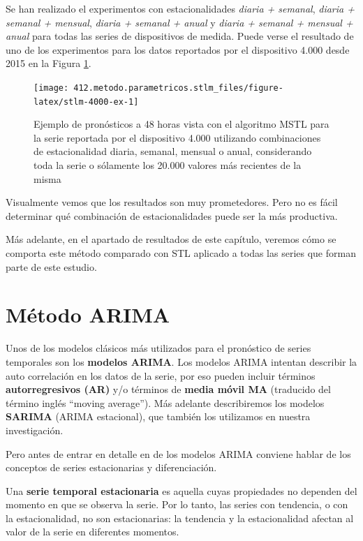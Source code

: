 \documentclass[]{book}
\begin{document}
Se han realizado el experimentos con estacionalidades \emph{diaria +
semanal}, \emph{diaria + semanal + mensual}, \emph{diaria + semanal +
anual} y \emph{diaria + semanal + mensual + anual} para todas las series
de dispositivos de medida. Puede verse el resultado de uno de los
experimentos para los datos reportados por el dispositivo 4.000 desde
2015 en la Figura \ref{fig:stlm-4000-ex}.

\begin{figure}

{\centering \texttt{[image: 412.metodo.parametricos.stlm\_files/figure-latex/stlm-4000-ex-1]} 

}

\caption{Ejemplo de pronósticos a 48 horas vista con el algoritmo MSTL para la serie reportada por el dispositivo 4.000 utilizando combinaciones de estacionalidad diaria, semanal, mensual o anual, considerando toda la serie o sólamente los 20.000 valores más recientes de la misma}\label{fig:stlm-4000-ex}
\end{figure}

Visualmente vemos que los resultados son muy prometedores. Pero no es
fácil determinar qué combinación de estacionalidades puede ser la más
productiva.

Más adelante, en el apartado de resultados de este capítulo, veremos
cómo se comporta este método comparado con STL aplicado a todas las
series que forman parte de este estudio.

\section{Método ARIMA}\label{metodo-arima}

Unos de los modelos clásicos más utilizados para el pronóstico de series
temporales son los \textbf{modelos ARIMA}. Los modelos ARIMA intentan
describir la auto correlación en los datos de la serie, por eso pueden
incluir términos \textbf{autorregresivos (AR)} y/o términos de
\textbf{media móvil MA} (traducido del término inglés ``moving
average''). Más adelante describiremos los modelos \textbf{SARIMA}
(ARIMA estacional), que también los utilizamos en nuestra investigación.

Pero antes de entrar en detalle en de los modelos ARIMA conviene hablar
de los conceptos de series estacionarias y diferenciación.

Una \textbf{serie temporal estacionaria} es aquella cuyas propiedades no
dependen del momento en que se observa la serie. Por lo tanto, las
series con tendencia, o con la estacionalidad, no son estacionarias: la
tendencia y la estacionalidad afectan al valor de la serie en diferentes
momentos.
\end{document}
